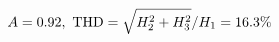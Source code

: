\documentclass[preview]{standalone}
\begin{document}
\begin{align*}
\special{dvisvgm:raw <g id='unique000'>}A=0.92,\ \text{THD}=\sqrt{H_2^2+H_3^2}/H_1=16.3\%\special{dvisvgm:raw </g>}
\end{align*}
\end{document}
